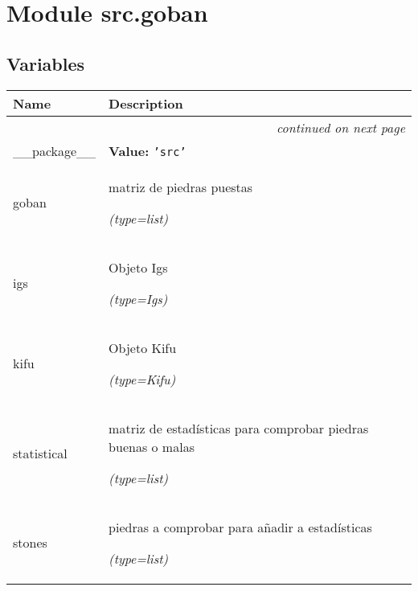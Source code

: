 %
%
%


\section{Module src.goban}

    \label{src:goban}


  \subsection{Variables}

    \vspace{-1cm}
\hspace{\varindent}\begin{longtable}{|p{\varnamewidth}|p{\vardescrwidth}|l}
\cline{1-2}
\cline{1-2} \centering \textbf{Name} & \centering \textbf{Description}& \\
\cline{1-2}
\endhead\cline{1-2}\multicolumn{3}{r}{\small\textit{continued on next page}}\\\endfoot\cline{1-2}
\endlastfoot\raggedright \_\-\_\-p\-a\-c\-k\-a\-g\-e\-\_\-\_\- & \raggedright \textbf{Value:} 
{\tt \texttt{'}\texttt{src}\texttt{'}}&\\
\cline{1-2}
\raggedright g\-o\-b\-a\-n\- & \raggedright matriz de piedras puestas

            {\it (type=list)}&\\
\cline{1-2}
\raggedright i\-g\-s\- & \raggedright Objeto Igs

            {\it (type=Igs)}&\\
\cline{1-2}
\raggedright k\-i\-f\-u\- & \raggedright Objeto Kifu

            {\it (type=Kifu)}&\\
\cline{1-2}
\raggedright s\-t\-a\-t\-i\-s\-t\-i\-c\-a\-l\- & \raggedright matriz de estadísticas para comprobar piedras buenas o malas

            {\it (type=list)}&\\
\cline{1-2}
\raggedright s\-t\-o\-n\-e\-s\- & \raggedright piedras a comprobar para añadir a estadísticas

            {\it (type=list)}&\\
\cline{1-2}
\end{longtable}


